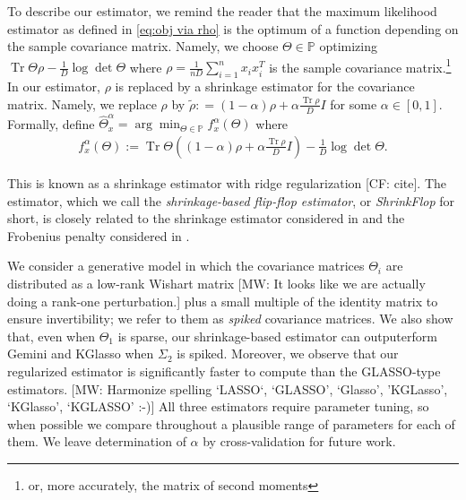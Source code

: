 \documentclass[aos]{imsart}
\theoremstyle{definition}
\numberwithin{equation}{section}
\DeclareMathOperator{\tr}{Tr}
\renewcommand{\P}{{\mathbb{P}}}
\newcommand{\samp}{x}
\newcommand{\CF}[1]{{\color{purple}[CF: #1]}}
\newcommand{\MW}[1]{{\color{red}[MW: #1]}}
\newcommand{\CF}[1]{{}}
\newcommand{\MW}[1]{{}}
\begin{document}
To describe our estimator, we remind the reader that the maximum likelihood estimator as defined in \cref{eq:obj via rho} is the optimum of a function depending on the sample covariance matrix.
Namely, we choose $\Theta \in \P$ optimizing $\tr \Theta \rho - \frac{1}{D}\log \det \Theta$ where $\rho = \frac{1}{n D} \sum_{i = 1}^n x_i x_i^T$ is the sample covariance matrix.\footnote{or, more accurately, the matrix of second moments}
In our estimator, $\rho$ is replaced by a shrinkage estimator for the covariance matrix.
Namely, we replace $\rho$ by $\tilde{\rho}: = (1- \alpha) \rho + \alpha \frac{\tr \rho}{D} I $ for some $\alpha \in [0,1]$. Formally, define $\widehat{\Theta}^\alpha_x = \arg\min_{\Theta \in \P} f^\alpha_\samp(\Theta)$ where 
\begin{align*}
  f_{\samp}^\alpha(\Theta)
  :=  \tr \Theta \left((1 - \alpha) \rho + \alpha \frac{\tr \rho}{D} I\right) - \frac{1}{D}\log\det\Theta.
\end{align*}

This is known as a shrinkage estimator with ridge regularization \CF{cite}.
The estimator, which we call the \emph{shrinkage-based flip-flop estimator}, or \emph{ShrinkFlop} for short, is closely related to the shrinkage estimator considered in \cite{goes2020robust} and the Frobenius penalty considered in \cite{tang2018integrated}.

We consider a generative model in which the covariance matrices $\Theta_i$ are distributed as a low-rank Wishart matrix \MW{It looks like we are actually doing a rank-one perturbation.} plus a small multiple of the identity matrix to ensure invertibility; we refer to them as \emph{spiked} covariance matrices.
We also show that, even when $\Theta_1$ is sparse, our shrinkage-based estimator can outputerform Gemini and KGlasso when $\Sigma_2$ is spiked.
Moreover, we observe that our regularized estimator is significantly faster to compute than the GLASSO-type estimators.
\MW{Harmonize spelling `LASSO`, `GLASSO', `Glasso', 'KGLasso', `KGlasso', `KGLASSO' :-)}
All three estimators require parameter tuning, so when possible we compare throughout a plausible range of parameters for each of them. We leave determination of $\alpha$ by cross-validation for future work.
\end{document}
